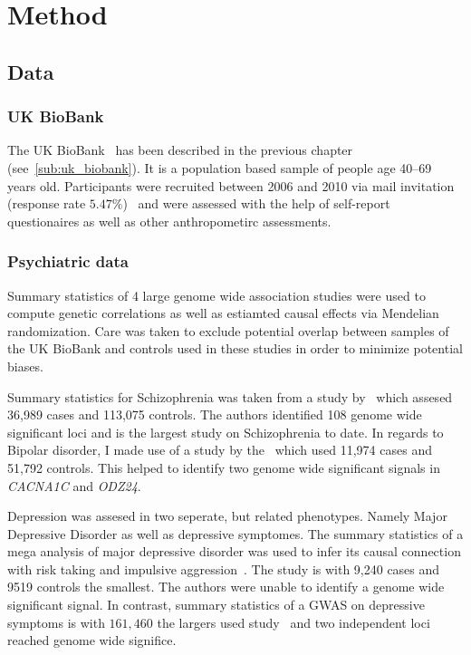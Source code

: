 \section{Method}
\label{sec:method}

\subsection{Data}
\label{sub:data}

\subsubsection{UK BioBank}
\label{ssub:uk_biobank_psych}
The UK BioBank~\cite{Allen2014} has been described in the previous chapter (see~\ref{sub:uk_biobank}).
It is a population based sample of people age 40--69 years old. 
Participants were recruited between 2006 and 2010 via mail invitation (response rate $5.47\%$)~\cite{Sudlow2015} and were assessed with the help of self-report questionaires as well as other anthropometirc assessments.

\subsubsection{Psychiatric data}
\label{ssub:psychiatric_data}

Summary statistics of 4 large genome wide association studies were used to compute genetic correlations as well as estiamted causal effects via Mendelian randomization.
Care was taken to exclude potential overlap between samples of the UK BioBank and controls used in these studies in order to minimize potential biases.

Summary statistics for Schizophrenia was taken from a study by~\citet{Ripke2014} which assesed 36,989 cases and 113,075 controls.
The authors identified 108 genome wide significant loci and is the largest study on Schizophrenia to date.
In regards to Bipolar disorder, I made use of a study by the~\citet{PsychiatricGWASConsortiumBipolarDisorderWorkingGroup2011} which used 11,974 cases and 51,792 controls.
This helped to identify two genome wide significant signals in \textit{CACNA1C} and \textit{ODZ24}.

Depression was assesed in two seperate, but related phenotypes. 
Namely Major Depressive Disorder as well as depressive symptomes.
The summary statistics of a mega analysis of major depressive disorder was used to infer its causal connection with risk taking and impulsive aggression~\cite{MajorDepressiveDisorderWorkingGroupofthePsychiatricGWASConsortium2013}.
The study is with 9,240 cases and 9519 controls the smallest. 
The authors were unable to identify a genome wide significant signal.
In contrast, summary statistics of a GWAS on depressive symptoms is with $161,460$ the largers used study~\cite{Okbay2016} and two independent loci reached genome wide significe.  
